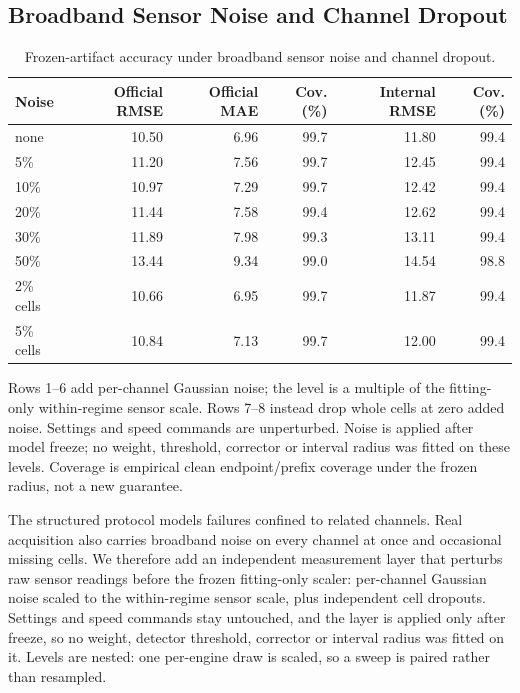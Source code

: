 \subsection{\textbf{Broadband Sensor Noise and Channel Dropout}}
\newcommand{\CurrentNoiseTable}{%
\begin{table}[!t]
\caption{Frozen-artifact accuracy under broadband sensor noise and channel dropout.}
\label{tab:noise}
\centering\footnotesize
\setlength{\tabcolsep}{3pt}
\begin{tabular}{lrrrrr}
\toprule
Noise & Official RMSE & Official MAE & Cov. (\%) & Internal RMSE & Cov. (\%) \\
\midrule
none & 10.50 & 6.96 & 99.7 & 11.80 & 99.4 \\
5\% & 11.20 & 7.56 & 99.7 & 12.45 & 99.4 \\
10\% & 10.97 & 7.29 & 99.7 & 12.42 & 99.4 \\
20\% & 11.44 & 7.58 & 99.4 & 12.62 & 99.4 \\
30\% & 11.89 & 7.98 & 99.3 & 13.11 & 99.4 \\
50\% & 13.44 & 9.34 & 99.0 & 14.54 & 98.8 \\
2\% cells & 10.66 & 6.95 & 99.7 & 11.87 & 99.4 \\
5\% cells & 10.84 & 7.13 & 99.7 & 12.00 & 99.4 \\
\bottomrule
\end{tabular}
\par\vspace{2pt}
\begin{minipage}{\textwidth}\scriptsize Rows 1--6 add per-channel Gaussian noise; the level is a multiple of the fitting-only within-regime sensor scale. Rows 7--8 instead drop whole cells at zero added noise. Settings and speed commands are unperturbed. Noise is applied after model freeze; no weight, threshold, corrector or interval radius was fitted on these levels. Coverage is empirical clean endpoint/prefix coverage under the frozen radius, not a new guarantee.\end{minipage}
\end{table}
}

\CurrentNoiseTable
The structured protocol models failures confined to related channels. Real
acquisition also carries broadband noise on every channel at once and occasional
missing cells. We therefore add an independent measurement layer that perturbs
raw sensor readings before the frozen fitting-only scaler: per-channel Gaussian
noise scaled to the within-regime sensor scale, plus independent cell dropouts.
Settings and speed commands stay untouched, and the layer is applied only after
freeze, so no weight, detector threshold, corrector or interval radius was fitted
on it. Levels are nested: one per-engine draw is scaled, so a sweep is paired
rather than resampled.

